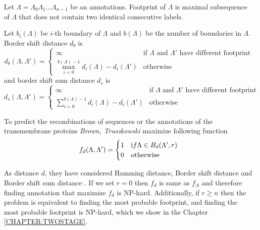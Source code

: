 \begin{definition}
Let $\Lambda=\Lambda_0\Lambda_1\dots\Lambda_{n-1}$ be an annotations. Footprint
of $\Lambda$ is maximal subsequence of $\Lambda$ that does not contain two
identical 
consecutive labels. \label{DEFINITION::FOOTPRINT}
\end{definition}

\begin{definition}
Let $b_i(\Lambda)$ be $i$-th boundary of $\Lambda$ and $b(\Lambda)$ be the
number of boundaries in $\Lambda$.
Border shift distance $d_{b}$ is 
\begin{equation*}
d_{b}(\Lambda,\Lambda') = \begin{cases}
\infty & \text{if $\Lambda$ and $\Lambda'$ have different footprint}\\
\max_{i=0}^{b(\Lambda)-1} d_i(\Lambda)-d_i(\Lambda') & \text{otherwise}
\end{cases}
\end{equation*}
and border shift sum distance $d_s$ is 
\begin{equation*}
d_{s}(\Lambda,\Lambda') = \begin{cases}
\infty & \text{if $\Lambda$ and $\Lambda'$ have different footprint}\\
\sum_{i=0}^{b(\Lambda)-1} d_i(\Lambda)-d_i(\Lambda') & \text{otherwise}
\end{cases}
\end{equation*}

\end{definition}

To predict the recombinations of sequences or the annotations of the
transmembrane proteins {\it Brown,
Truszkowski} maximize following function
\begin{equation*}
f_d(\Lambda,\Lambda') = 
\begin{cases}
1 & {\text if }\Lambda\in B_d(\Lambda',r)\\
0 & \text{otherwise}
\end{cases}
\end{equation*}

As distance $d$, they have considered Hamming distance, Border shift distance
and Border shift sum distance \cite{Brown2010}.  If we set $r=0$ then $f_d$ is
same as $f_A$ and therefore finding annotation that maximize $f_d$ is NP-hard.
Additionally, if $r\geq n$ then the problem is equivalent to finding the most
probable footprint, and finding the most probable footprint is NP-hard, which
we show in the Chapter \ref{CHAPTER:TWOSTAGE}.

